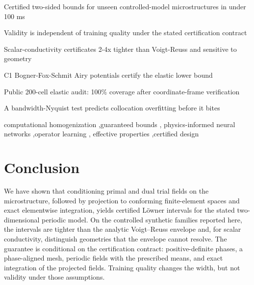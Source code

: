 \documentclass[preprint,12pt]{elsarticle}
\begin{document}
\begin{frontmatter}
\begin{highlights}
\item Certified two-sided bounds for unseen controlled-model microstructures in under 100 ms
\item Validity is independent of training quality under the stated certification contract
\item Scalar-conductivity certificates 2-4x tighter than Voigt-Reuss and sensitive to geometry
\item C1 Bogner-Fox-Schmit Airy potentials certify the elastic lower bound
\item Public 200-cell elastic audit: 100\% coverage after coordinate-frame verification
\item A bandwidth-Nyquist test predicts collocation overfitting before it bites
\end{highlights}

\begin{keyword}
computational homogenization \sep guaranteed bounds \sep
physics-informed neural networks \sep operator learning \sep
effective properties \sep certified design
\end{keyword}

\end{frontmatter}










\section{Conclusion}
\label{sec:conclusion}

We have shown that conditioning primal and dual trial fields on the
microstructure, followed by projection to conforming finite-element spaces
and exact elementwise integration, yields certified L\"owner intervals for
the stated two-dimensional periodic model. On the controlled synthetic
families reported here, the intervals are tighter than the analytic
Voigt--Reuss envelope and, for scalar conductivity, distinguish geometries
that the envelope cannot resolve. The guarantee is conditional on the
certification contract:
positive-definite phases, a phase-aligned mesh, periodic fields with the
prescribed means, and exact integration of the projected fields. Training
quality changes the width, but not validity under those assumptions.
\end{document}

